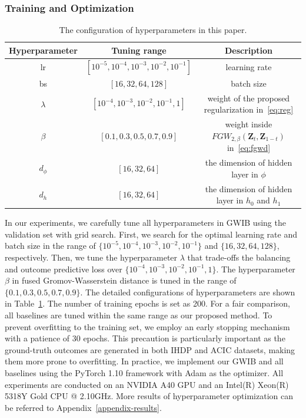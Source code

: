 \documentclass{article}
\begin{document}
\subsubsection{Training and Optimization}
\begin{table}[t]
    \label{tab:hyper}
    \setlength{\abovecaptionskip}{0.25cm}
    \setlength{\fboxrule}{0pt}
    \setlength{\fboxsep}{0.pt}
    \centering
    \caption{The configuration of hyperparameters in this paper.} 
        \begin{tabular}{c|c|c}  
            \hline \hline 
            Hyperparameter&Tuning range&Description \\  
            \hline
            lr & $\left[10^{-5},10^{-4},10^{-3},10^{-2},10^{-1}\right]$ & learning rate\\
            bs & $\left[16, 32, 64, 128\right]$ & batch size\\
            $\lambda$ & $\left[10^{-4},10^{-3},10^{-2},10^{-1}, 1\right]$ & weight of the proposed regularization in~\eqref{eq:reg}\\  
            $\beta$ & $\left[0.1, 0.3, 0.5, 0.7, 0.9\right]$ & weight inside $FGW_{2,\beta}(\bm{Z}_t,\bm{Z}_{1-t})$ in~\eqref{eq:fgwd}\\
            $d_{\phi}$ & $\left[16, 32, 64\right]$ & the dimension of hidden layer in $\phi$\\
            $d_{h}$ & $\left[16, 32, 64\right]$ & the dimension of hidden layer in $h_0$ and $h_1$\\
            \hline \hline
        \end{tabular}
\end{table}
In our experiments, we carefully tune all hyperparameters in GWIB using the validation set with grid search. 
First, we search for the optimal learning rate and batch size in the range of $\{10^{-5}, 10^{-4}, 10^{-3}, 10^{-2}, 10^{-1}\}$ and $\{16, 32, 64, 128\}$, respectively.
Then, we tune the hyperparameter $\lambda$ that trade-offs the balancing and outcome predictive loss over $\{10^{-4}, 10^{-3}, 10^{-2}, 10^{-1}, 1\}$.
The hyperparameter $\beta$ in fused Gromov-Wasserstein distance is tuned in the range of $\{0.1, 0.3, 0.5, 0.7, 0.9\}$.
The detailed configurations of hyperparameters are shown in Table~\ref{tab:hyper}.
The number of training epochs is set as 200.
For a fair comparison, all baselines are tuned within the same range as our proposed method. 
To prevent overfitting to the training set, we employ an early stopping mechanism with a patience of 30 epochs.
This precaution is particularly important as the ground-truth outcomes are generated in both IHDP and ACIC datasets, making them more prone to overfitting.
In practice, we implement our GWIB and all baselines using the PyTorch 1.10 framework with Adam as the optimizer.
All experiments are conducted on an NVIDIA A40 GPU and an Intel(R) Xeon(R) 5318Y Gold CPU @ 2.10GHz. 
More results of hyperparameter optimization can be referred to Appendix~\ref{appendix-results}.
\end{document}
